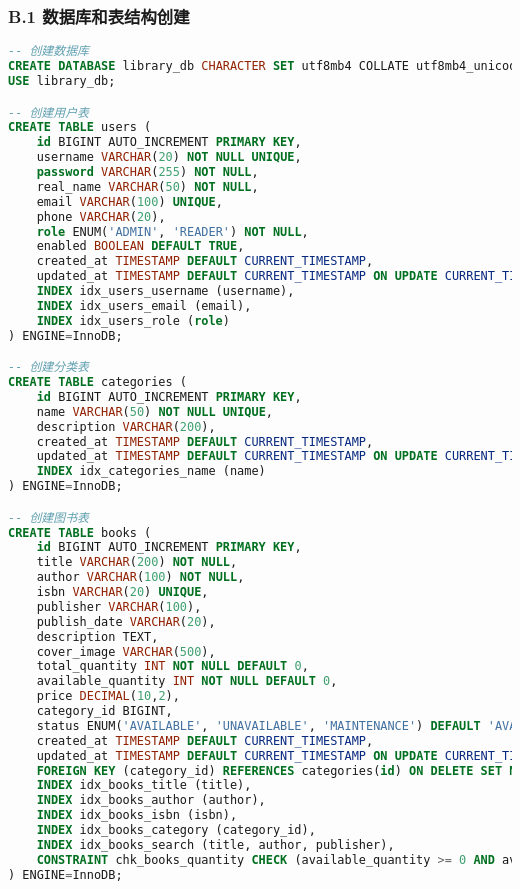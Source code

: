 \documentclass[12pt,a4paper]{article}
\begin{document}
\subsubsection*{B.1 数据库和表结构创建}
\begin{lstlisting}[language=sql]
-- 创建数据库
CREATE DATABASE library_db CHARACTER SET utf8mb4 COLLATE utf8mb4_unicode_ci;
USE library_db;

-- 创建用户表
CREATE TABLE users (
    id BIGINT AUTO_INCREMENT PRIMARY KEY,
    username VARCHAR(20) NOT NULL UNIQUE,
    password VARCHAR(255) NOT NULL,
    real_name VARCHAR(50) NOT NULL,
    email VARCHAR(100) UNIQUE,
    phone VARCHAR(20),
    role ENUM('ADMIN', 'READER') NOT NULL,
    enabled BOOLEAN DEFAULT TRUE,
    created_at TIMESTAMP DEFAULT CURRENT_TIMESTAMP,
    updated_at TIMESTAMP DEFAULT CURRENT_TIMESTAMP ON UPDATE CURRENT_TIMESTAMP,
    INDEX idx_users_username (username),
    INDEX idx_users_email (email),
    INDEX idx_users_role (role)
) ENGINE=InnoDB;

-- 创建分类表
CREATE TABLE categories (
    id BIGINT AUTO_INCREMENT PRIMARY KEY,
    name VARCHAR(50) NOT NULL UNIQUE,
    description VARCHAR(200),
    created_at TIMESTAMP DEFAULT CURRENT_TIMESTAMP,
    updated_at TIMESTAMP DEFAULT CURRENT_TIMESTAMP ON UPDATE CURRENT_TIMESTAMP,
    INDEX idx_categories_name (name)
) ENGINE=InnoDB;

-- 创建图书表
CREATE TABLE books (
    id BIGINT AUTO_INCREMENT PRIMARY KEY,
    title VARCHAR(200) NOT NULL,
    author VARCHAR(100) NOT NULL,
    isbn VARCHAR(20) UNIQUE,
    publisher VARCHAR(100),
    publish_date VARCHAR(20),
    description TEXT,
    cover_image VARCHAR(500),
    total_quantity INT NOT NULL DEFAULT 0,
    available_quantity INT NOT NULL DEFAULT 0,
    price DECIMAL(10,2),
    category_id BIGINT,
    status ENUM('AVAILABLE', 'UNAVAILABLE', 'MAINTENANCE') DEFAULT 'AVAILABLE',
    created_at TIMESTAMP DEFAULT CURRENT_TIMESTAMP,
    updated_at TIMESTAMP DEFAULT CURRENT_TIMESTAMP ON UPDATE CURRENT_TIMESTAMP,
    FOREIGN KEY (category_id) REFERENCES categories(id) ON DELETE SET NULL,
    INDEX idx_books_title (title),
    INDEX idx_books_author (author),
    INDEX idx_books_isbn (isbn),
    INDEX idx_books_category (category_id),
    INDEX idx_books_search (title, author, publisher),
    CONSTRAINT chk_books_quantity CHECK (available_quantity >= 0 AND available_quantity <= total_quantity)
) ENGINE=InnoDB;


\end{lstlisting}
\end{document}
